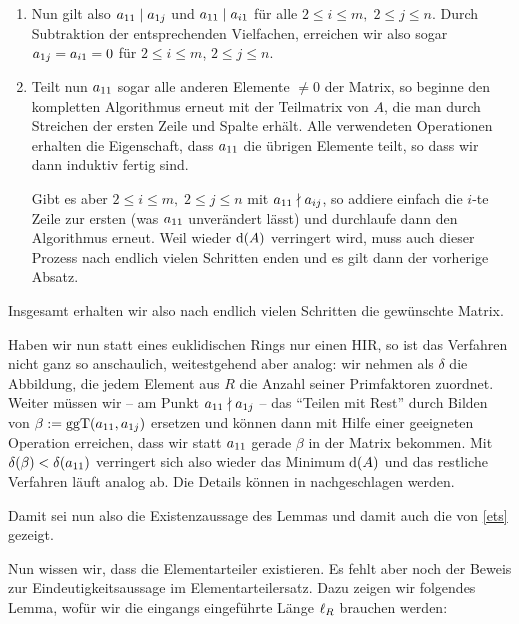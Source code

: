 \begin{proofsketch}
\begin{enumerate}[1.]
        \item
            Nun gilt also $a_{11} \mid a_{1j}$ und $a_{11} \mid a_{i1}$ für alle
            $2\leq i\leq m,\; 2\leq j\leq n$. Durch Subtraktion der entsprechenden
            Vielfachen, erreichen wir also sogar $a_{1j} = a_{i1} = 0$ für
            $2\leq i\leq m$, $2\leq j\leq n$.
            
        \item
            Teilt nun $a_{11}$ sogar alle anderen Elemente $\neq 0$ der Matrix, so
            beginne den kompletten Algorithmus erneut mit der Teilmatrix von
            $A$, die man durch Streichen der ersten Zeile und Spalte erhält.
            Alle verwendeten Operationen erhalten die Eigenschaft, dass $a_{11}$
            die übrigen Elemente teilt, so dass wir dann induktiv fertig sind.
            
            Gibt es aber $2\leq i\leq m,\; 2\leq j\leq n$ mit $a_{11} \nmid a_{ij}$, so
            addiere einfach die $i$-te Zeile zur ersten (was $a_{11}$ unverändert
            lässt) und durchlaufe dann den Algorithmus erneut. Weil wieder
            $\mathrm{d}(A)$ verringert wird, muss auch dieser Prozess nach endlich
            vielen Schritten enden und es gilt dann der vorherige Absatz.
    \end{enumerate}
    Insgesamt erhalten wir also nach endlich vielen Schritten die gewünschte
    Matrix.
    
    Haben wir nun statt eines euklidischen Rings nur einen HIR, so ist das
    Verfahren nicht ganz so anschaulich, weitestgehend aber analog: wir nehmen
    als $\delta$ die Abbildung, die jedem Element aus $R$ die Anzahl seiner
    Primfaktoren zuordnet. Weiter müssen wir -- am Punkt $a_{11} \nmid a_{1j}$ --
    das \enquote{Teilen mit Rest} durch Bilden von 
    $\beta := \mathrm{ggT}(a_{11},a_{1j})$ ersetzen und können dann mit Hilfe einer
    geeigneten Operation erreichen, dass wir statt $a_{11}$ gerade $\beta$ in
    der Matrix bekommen. Mit $\delta(\beta) < \delta(a_{11})$ verringert sich also
    wieder das Minimum $\mathrm{d}(A)$ und das restliche Verfahren läuft analog ab. Die
    Details können in \cite[S.\,213\,f.]{bookc:bosch08} nachgeschlagen werden.
    
    Damit sei nun also die Existenzaussage des Lemmas und damit auch die von
    \cref{ets} gezeigt.
    \\
\end{proofsketch}

Nun wissen wir, dass die Elementarteiler existieren. Es fehlt aber noch der
Beweis zur Eindeutigkeitsaussage im Elementarteilersatz. Dazu zeigen wir
folgendes Lemma, wofür wir die eingangs eingeführte Länge $\operatorname{\ell}_{R}$ brauchen
werden:

